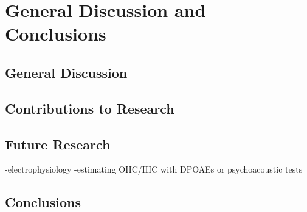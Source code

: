 \chapter{General Discussion and Conclusions}
\section{General Discussion}

\section{Contributions to Research}

\section{Future Research}
-electrophysiology
-estimating OHC/IHC with DPOAEs or psychoacoustic tests 

\section{Conclusions}